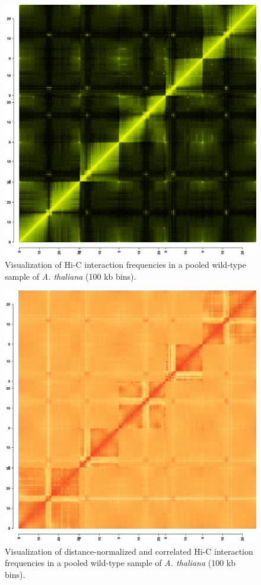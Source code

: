 \documentclass[a4paper,10pt]{article}
\begin{document}
\clearpage
\begin{figure}[!ht]
\begin{center}
\centering
\includegraphics[width=5in]{Hi-C_raw_combined.png}
\end{center}
\caption{Visualization of Hi-C interaction frequencies in a pooled wild-type sample of \textit{A. thaliana} \cite{2012_Moissiard,2014_Grob} (100 kb bins).}
\label{rawHi-Cmat}
\end{figure}
\clearpage
\begin{figure}[!ht]
\begin{center}
\centering
\includegraphics[width=5in]{Hi-C_cor_combined.png}
\end{center}
\caption{Visualization of distance-normalized and correlated Hi-C interaction frequencies in a pooled wild-type sample of \textit{A. thaliana} \cite{2012_Moissiard,2014_Grob} (100 kb bins).}
\label{corHi-Cmat}
\end{figure}
\end{document}
